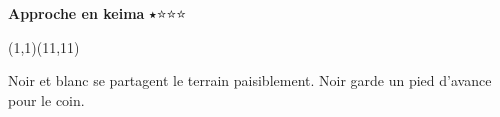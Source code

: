 \documentclass[preview, border=0pt, varwidth=false]{standalone}
\begin{document}
	\setgounit{0.6cm} 
	
\parbox[c][14.65cm][c]{10.2cm}{
	\centering
	
	{\Large\textbf{Approche en keima} $\medblackstar \medwhitestar \medwhitestar \medwhitestar$ \\ }
	\vspace{3em}
	
	\begin{psgopartialboard}{(1,1)(11,11)}
		\pass
	\end{psgopartialboard}
	
	\vspace{1em}
	Noir et blanc se partagent le terrain paisiblement. Noir garde un pied d'avance pour le coin.
}
\end{document}
